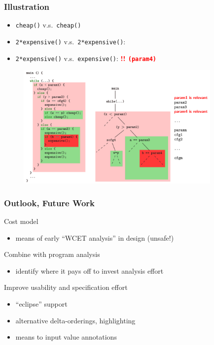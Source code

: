 \documentclass{beamer}
\begin{document}
\begin{frame}[fragile]
  \frametitle{Illustration}

  \begin{itemize}
    \item {\tt cheap()} v.s.~{\tt cheap()} \textcolor{green}{\Large \checkmark}
    \item {\tt 2*expensive()} v.s.~{\tt 2*expensive()}: \textcolor{green}{\Large \checkmark}
    \item {\tt 2*expensive()} v.s.~{\tt expensive()}: \textcolor{red}{\bf !! \small \tt (param4)}
  \end{itemize}

  \begin{figure}
    \includegraphics[width=10cm]{img/overview.pdf} 
  \end{figure}
\end{frame} 



\begin{frame}[fragile]
  \frametitle{Outlook, Future Work}

  \bigskip
  Cost model 
  \begin{itemize}
    \item means of early ``WCET analysis'' in design (unsafe!)
  \end{itemize}

  \bigskip
  Combine with program analysis 
  \begin{itemize}
    \item identify where it pays off to invest analysis effort
  \end{itemize}

  \bigskip
  Improve usability and specification effort 
  \begin{itemize}
    \item ``eclipse'' support
    \item alternative delta-orderings, highlighting
    \item means to input value annotations
  \end{itemize}
\end{frame}
\end{document}
